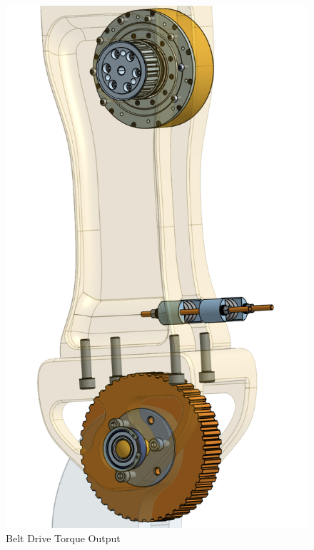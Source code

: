 \documentclass{article}
\begin{document}
\begin{figure}[H]
    \centering
    \includegraphics[scale=0.8]{assets/Design Presentation/Belt Drive Knee Output.png}
    \caption{Belt Drive Torque Output}
    \label{fig:enter-label}
\end{figure}
\end{document}
